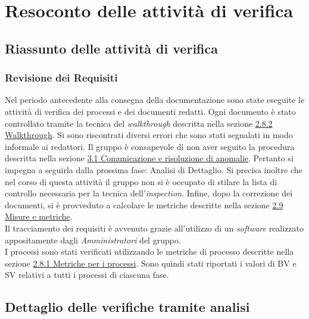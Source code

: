 \section{Resoconto delle attività di verifica}
\label{cap:Sezione 5 Resoconto delle attività di verifica}

\subsection{Riassunto delle attività di verifica}

\subsubsection{Revisione dei Requisiti}

Nel periodo antecedente alla consegna della documentazione sono state eseguite le attività di verifica dei processi e dei documenti redatti. Ogni documento è stato controllato tramite la tecnica del \textit{walkthrough} descritta nella sezione \hyperref[cap:sezione 2.8.2 Walkthrough]{2.8.2 Walkthrough}. Si sono riscontrati diversi errori che sono stati segnalati in modo informale ai redattori. Il gruppo è consapevole di non aver seguito la procedura descritta nella sezione \hyperref[cap: sezione 3.1 Comunicazione e risoluzione di anomalie]{3.1 Comunicazione e risoluzione di anomalie}. Pertanto si impegna a seguirla dalla prossima fase: Analisi di Dettaglio. Si precisa inoltre che nel corso di questa attività il gruppo non si è occupato di stilare la lista di controllo necessaria per la tecnica dell'\textit{inspection}. Infine, dopo la correzione dei documenti, si è provveduto a calcolare le metriche descritte nella sezione \hyperref[cap:sezione 2.9 Misure e metriche]{2.9 Misure e metriche}. \\
Il tracciamento dei requisiti è avvenuto grazie all'utilizzo di un \textit{software} realizzato appositamente dagli \textit{Amministratori} del gruppo. \\
I processi sono stati verificati utilizzando le metriche di processo descritte nella sezione \hyperref[cap: sezione 2.8.1 Metriche per i processi]{2.8.1 Metriche per i processi}. Sono quindi stati riportati i valori di BV e SV relativi a tutti i processi di ciascuna fase.

\subsection{Dettaglio delle verifiche tramite analisi}

